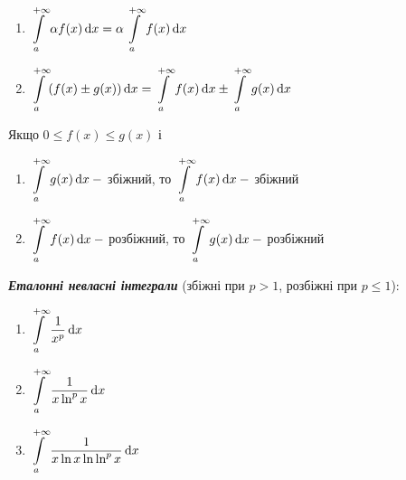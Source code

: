 \begin{theorem}  

\end{theorem}

\begin{enumerate} 
\item  $\displaystyle\int\limits_a^{+\infty} \alpha f(x) \, \mathrm{d}x = \alpha \displaystyle\int\limits_a^{+\infty} f(x) \, \mathrm{d}x $
\item $\displaystyle\int\limits_a^{+\infty} (f(x) \pm g(x)) \, \mathrm{d}x = \displaystyle\int\limits_a^{+\infty} f(x) \, \mathrm{d}x \pm \displaystyle\int\limits_a^{+\infty} g(x) \, \mathrm{d}x $
\end{enumerate}

\begin{theorem} 
Якщо $0 \leqslant  f(x) \leqslant  g(x) $ і 
     \begin{enumerate}
           \item $\displaystyle\int\limits_a^{+\infty} g(x) \, \mathrm{d}x \: - $  збіжний, то $\displaystyle\int\limits_a^{+\infty} f(x) \, \mathrm{d}x \: - $ збіжний 
           \item  $\displaystyle\int\limits_a^{+\infty} f(x) \, \mathrm{d}x \: - $ розбіжний, то 
            $\displaystyle\int\limits_a^{+\infty} g(x) \, \mathrm{d}x \: - $ розбіжний
       \end{enumerate}

\end{theorem}
 \textcolor{NavyBlue}{\textbf{\textit{Еталонні невласні інтеграли }}}
(збіжні при $p>1$, розбіжні при $p \leqslant  1$):

\begin{enumerate}
\item $\displaystyle\int\limits_a^{+\infty} \dfrac{1}{x^p} \, \mathrm{d}x $


\item $\displaystyle\int\limits_a^{+\infty} \dfrac{1}{x  \ln^px} \, \mathrm{d}x $


\item $\displaystyle\int\limits_a^{+\infty} \dfrac{1}{x  \ln x  \ln \ln^px} \, \mathrm{d}x $
\end{enumerate}

